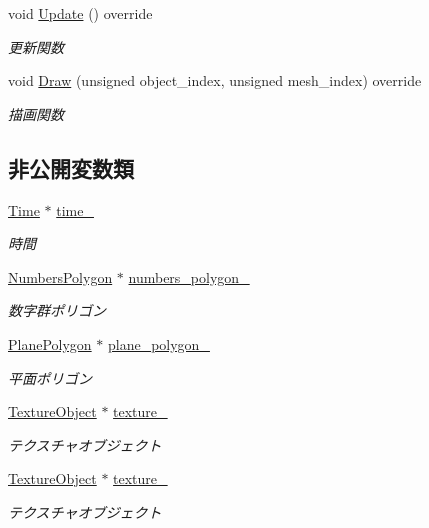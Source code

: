 \begin{DoxyCompactItemize}
void \mbox{\hyperlink{class_time_draw_a2471360fb021ce38bec34dbe6f171b9f}{Update}} () override
\begin{DoxyCompactList}\small\item\em 更新関数 \end{DoxyCompactList}\item 
void \mbox{\hyperlink{class_time_draw_a1d5bd7b20e71eb37f3f0b225079cc9b3}{Draw}} (unsigned object\+\_\+index, unsigned mesh\+\_\+index) override
\begin{DoxyCompactList}\small\item\em 描画関数 \end{DoxyCompactList}\end{DoxyCompactItemize}
\subsection*{非公開変数類}
\begin{DoxyCompactItemize}
\item 
\mbox{\hyperlink{class_time}{Time}} $\ast$ \mbox{\hyperlink{class_time_draw_a83b53ac1efa11c6737564a5490b10312}{time\+\_\+}}
\begin{DoxyCompactList}\small\item\em 時間 \end{DoxyCompactList}\item 
\mbox{\hyperlink{class_numbers_polygon}{Numbers\+Polygon}} $\ast$ \mbox{\hyperlink{class_time_draw_a5debc3ca2af05073560a1a3a30426d14}{numbers\+\_\+polygon\+\_\+}}
\begin{DoxyCompactList}\small\item\em 数字群ポリゴン \end{DoxyCompactList}\item 
\mbox{\hyperlink{class_plane_polygon}{Plane\+Polygon}} $\ast$ \mbox{\hyperlink{class_time_draw_ab21ae68b078069640c8317325601ac75}{plane\+\_\+polygon\+\_\+}}
\begin{DoxyCompactList}\small\item\em 平面ポリゴン \end{DoxyCompactList}\item 
\mbox{\hyperlink{class_texture_object}{Texture\+Object}} $\ast$ \mbox{\hyperlink{class_time_draw_a1ea93191d534fba6d46e570c3ccd5396}{texture\+\_\+}}
\begin{DoxyCompactList}\small\item\em テクスチャオブジェクト \end{DoxyCompactList}\item 
\mbox{\hyperlink{class_texture_object}{Texture\+Object}} $\ast$ \mbox{\hyperlink{class_time_draw_a927363821346555965ae3ee3b712b30e}{texture\+\_}}
\begin{DoxyCompactList}\small\item\em テクスチャオブジェクト \end{DoxyCompactList}\end{DoxyCompactItemize}
